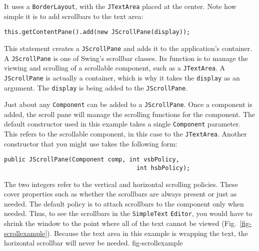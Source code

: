 \clearpage
\noindent It uses a {\tt BorderLayout}, with the {\tt JTextArea}
placed at the center.  Note how simple it is to add
scrollbars to the text area:

\begin{jjjlisting}
\begin{lstlisting}
this.getContentPane().add(new JScrollPane(display));
\end{lstlisting}
\end{jjjlisting}

\noindent This statement creates a {\tt JScrollPane} and
adds it to the application's container.  A {\tt JScrollPane} is one of
Swing's scrollbar classes. Its function is to manage the viewing and
scrolling of a scrollable component, such as a {\tt JTextArea}.  A
{\tt JScrollPane} is actually a container, which is why it takes the
{\tt display} as an argument. The {\tt display} is being added to the
{\tt JScrollPane}.

Just about any {\tt Component} can be added to a {\tt JScrollPane}.
Once a component is added, the scroll pane will manage the
scrolling functions for the component. The default constructor used in
this example takes a single {\tt Component} parameter. This refers to
the scrollable component, in this case to the {\tt JTextArea}.
Another constructor that you might use takes the following form:

\begin{jjjlisting}
\begin{lstlisting}
public JScrollPane(Component comp, int vsbPolicy, 
                                     int hsbPolicy);
\end{lstlisting}
\end{jjjlisting}

\noindent The two integers refer to the vertical and horizontal
scrolling policies. These cover properties such as whether the
scrollbars are always present or just as needed. The default policy is
to attach scrollbars to the component only when needed. Thus, to see
the scrollbars in the {\tt SimpleText} {\tt Editor}, you would have to shrink
the window to the point where all of the text cannot be viewed
(Fig.~\ref{fig-scrollexample}).  Because the text area in this example
is wrapping the text, the horizontal scrollbar will never be needed.
{fig-scrollexample}


